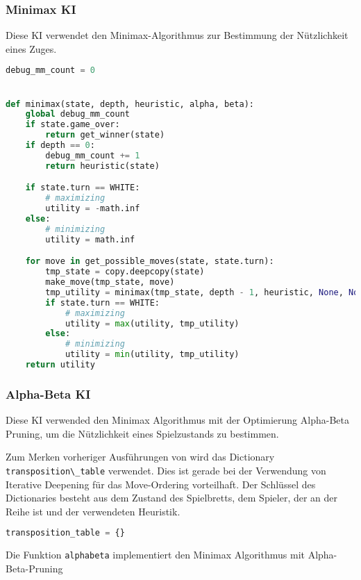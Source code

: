 \hypertarget{minimax-ki}{%
\subsubsection{Minimax KI}\label{minimax-ki}}

Diese KI verwendet den Minimax-Algorithmus zur Bestimmung der
Nützlichkeit eines Zuges.

\begin{lstlisting}[language=Python]
debug_mm_count = 0


def minimax(state, depth, heuristic, alpha, beta):
    global debug_mm_count
    if state.game_over:
        return get_winner(state)
    if depth == 0:
        debug_mm_count += 1
        return heuristic(state)

    if state.turn == WHITE:
        # maximizing
        utility = -math.inf
    else:
        # minimizing
        utility = math.inf

    for move in get_possible_moves(state, state.turn):
        tmp_state = copy.deepcopy(state)
        make_move(tmp_state, move)
        tmp_utility = minimax(tmp_state, depth - 1, heuristic, None, None)
        if state.turn == WHITE:
            # maximizing
            utility = max(utility, tmp_utility)
        else:
            # minimizing
            utility = min(utility, tmp_utility)
    return utility
\end{lstlisting}

\hypertarget{alpha-beta-ki}{%
\subsubsection{Alpha-Beta KI}\label{alpha-beta-ki}}

Diese KI verwended den Minimax Algorithmus mit der Optimierung
Alpha-Beta Pruning, um die Nützlichkeit eines Spielzustands zu
bestimmen.

Zum Merken vorheriger Ausführungen von wird das Dictionary
\passthrough{\lstinline!transposition\_table!} verwendet. Dies ist
gerade bei der Verwendung von Iterative Deepening für das Move-Ordering
vorteilhaft. Der Schlüssel des Dictionaries besteht aus dem Zustand des
Spielbretts, dem Spieler, der an der Reihe ist und der verwendeten
Heuristik.

\begin{lstlisting}[language=Python]
transposition_table = {}
\end{lstlisting}

Die Funktion \passthrough{\lstinline!alphabeta!} implementiert den
Minimax Algorithmus mit Alpha-Beta-Pruning

